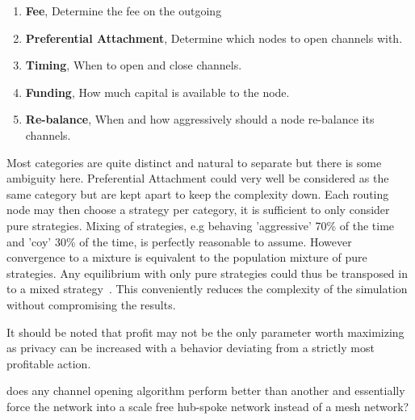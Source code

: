 \begin{enumerate}
	\item \textbf{Fee}, Determine the fee on the outgoing
	\item \textbf{Preferential Attachment}, Determine which nodes to open channels with.
	\item \textbf{Timing}, When to open and close channels.
	\item \textbf{Funding}, How much capital is available to the node.
	\item \textbf{Re-balance}, When and how aggressively should a node re-balance its channels.  
\end{enumerate}

Most categories are quite distinct and natural to separate but there is some ambiguity here. Preferential Attachment could very well be considered as the same category but are kept apart to keep the complexity down. Each routing node may then choose a strategy per category, it is sufficient to only consider pure strategies. Mixing of strategies, e.g behaving 'aggressive' 70\% of the time and 'coy' 30\% of the time, is perfectly reasonable to assume. However convergence to a mixture is equivalent to the population mixture of pure strategies. Any equilibrium with only pure strategies could thus be transposed in to a mixed strategy~\cite{easly:kleinberg:network:crowds:markets}. This conveniently reduces the complexity of the simulation without compromising the results. 




It should be noted that profit may not be the only parameter worth maximizing as privacy can be increased with a behavior deviating from a strictly most profitable action.   

does any channel opening algorithm perform better than another and essentially force the network into a scale free hub-spoke network instead of a mesh network?


\newpage
\onecolumn

